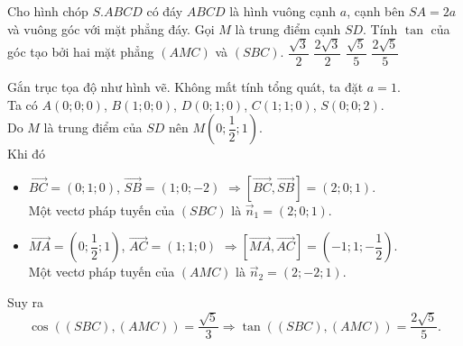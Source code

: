 \begin{ex}%
Cho hình chóp $S.ABCD$ có đáy $ABCD$ là hình vuông cạnh $a$, cạnh bên $SA = 2a$ và vuông góc với mặt phẳng đáy. Gọi $M$ là trung điểm cạnh $SD$. Tính $\tan$ của góc tạo bởi hai mặt phẳng $\left(AMC\right)$ và $\left(SBC\right)$.
\choice
{$\dfrac{\sqrt{3}}{2}$}
{$\dfrac{2\sqrt{3}}{2}$}
{$\dfrac{\sqrt{5}}{5}$}
{\True $\dfrac{2\sqrt{5}}{5}$}
\loigiai
{
\begin{center}
\end{center}
Gắn trục tọa độ như hình vẽ. Không mất tính tổng quát, ta đặt $a=1$.\\
Ta có $A\left(0;0;0\right)$, $B\left(1;0;0\right)$, $D\left(0;1;0\right)$, $C\left(1;1;0\right)$, $S\left(0;0;2\right)$.\\
Do $M$ là trung điểm của $SD$ nên $M\left(0;\dfrac{1}{2};1\right)$.\\
Khi đó 
\begin{itemize}
\item $\overrightarrow{BC} = \left(0;1;0\right)$, $\overrightarrow{SB} = \left(1;0;-2\right)$ $\Rightarrow \left[\overrightarrow{BC},\overrightarrow{SB}\right] = \left(2;0;1\right)$. \\
Một vectơ pháp tuyến của $\left(SBC\right)$ là $\overrightarrow{n}_1 = \left(2;0;1\right)$.
\item $\overrightarrow{MA} = \left(0;\dfrac{1}{2};1\right)$, $\overrightarrow{AC} = \left(1;1;0\right)$ $\Rightarrow\left[\overrightarrow{MA},\overrightarrow{AC}\right] = \left(-1;1;-\dfrac{1}{2}\right)$. \\
Một vectơ pháp tuyến của $\left(AMC\right)$ là $\overrightarrow{n}_2 = \left(2;-2;1\right)$.
\end{itemize}
Suy ra 
\[\cos\left(\left(SBC\right),\left(AMC\right)\right) = \dfrac{\sqrt{5}}{3}\Rightarrow \tan \left(\left(SBC\right),\left(AMC\right)\right) = \dfrac{2\sqrt{5}}{5}.\]
}
\end{ex}


